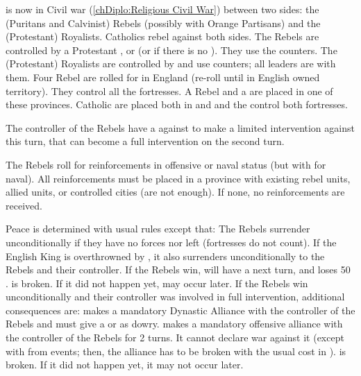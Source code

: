
\phevnt
\aparag \ENG is now in Civil war (\ref{chDiplo:Religious Civil War}) between
two sides: the (Puritans and Calvinist) Rebels (possibly with Orange
Partisans) and the (Protestant) Royalists. Catholics rebel against both sides.
\bparag The Rebels are controlled by a Protestant \FRA, or \HOL (or \SUE if
there is no \HOL). They use the \paysroyalistes counters.
\bparag The (Protestant) Royalists are controlled by \ENG and use \ENG
counters; all \ENG leaders are with them.
\aparag Four Rebel \REVOLT are rolled for in England (re-roll until in English
owned territory). They control all the fortresses.
\bparag A Rebel \ARMY \facemoins and a \LeaderG are placed in one of these
provinces.
\aparag Catholic \REVOLT \faceplus are placed both in \provinceConnacht and
\provinceMumhan and the \REVOLT control both fortresses.

\phdipl
\aparag The controller of the Rebels have a \CB against \ENG to make a limited
intervention against \ENG this turn, that can become a full intervention on
the second turn.

\phadm
\aparag The Rebels roll for reinforcements in offensive or naval status (but
with  for naval).
\aparag All reinforcements must be placed in a province with existing rebel
units, allied units, or controlled cities (\REVOLT are not enough). If none,
no reinforcements are received.

\phpaix
\aparag Peace is determined with usual rules except that:
\bparag The Rebels surrender unconditionally if they have no forces nor
\REVOLT left (fortresses do not count).
\bparag If the English King is overthrowned by \REVOLT, it also surrenders
unconditionally to the Rebels and their controller.
\aparag If the Rebels win, \ENG will have a  next turn,
and loses 50 \PV.
\bparag {} is broken. If it did not happen yet, may
occur later.
\aparag If the Rebels win unconditionally and their controller was involved in
full intervention, additional consequences are:
\bparag \ENG makes a mandatory Dynastic Alliance with the controller of the
Rebels and must give a \COL or \TP as dowry.
\bparag \ENG makes a mandatory offensive alliance with the controller of the
Rebels for 2 turns. It cannot declare war against it (except with \CB from
events; then, the alliance has to be broken with the usual cost in \STAB).
\bparag {} is broken. If it did not happen yet, it may
not occur later.



